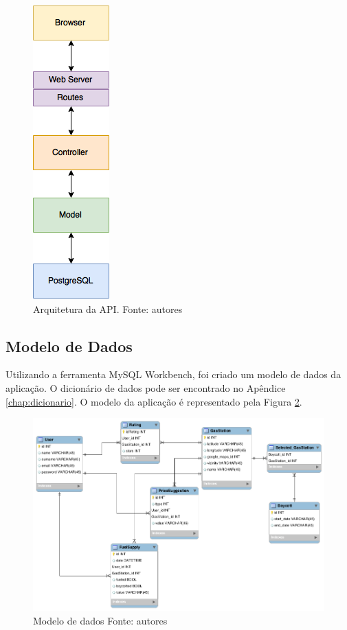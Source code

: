 \begin{figure}[H]
    \centering
    \includegraphics[scale=0.5]{figuras/api_arch.png}
    \caption[Arquitetura da API]{Arquitetura da API. Fonte: autores}
    \label{img:arquitetura}
\end{figure}


\subsection{Modelo de Dados}

Utilizando a ferramenta MySQL Workbench, foi criado um modelo de dados da aplicação. O dicionário de dados pode ser encontrado no Apêndice \ref{chap:dicionario}. O modelo da aplicação é representado pela Figura \ref{img:modelo_de_dados}.

\begin{figure}[H]
    \centering
    \includegraphics[scale=0.5]{figuras/db_model.png}
    \caption[Modelo de dados]{Modelo de dados Fonte: autores}
    \label{img:modelo_de_dados}
\end{figure}
